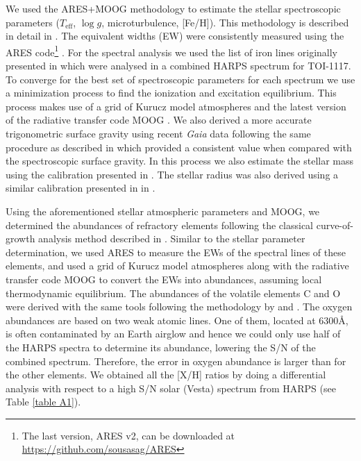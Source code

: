 \documentclass[fleqn,usenatbib,useAMS]{mnras}
\begin{document}
We used the ARES+MOOG methodology to estimate the stellar spectroscopic parameters ($T_{\mathrm{eff}}$, $\log g$, microturbulence, [Fe/H]). This methodology is described in detail in \citet[][]{Sousa-21, Sousa-14, Santos-13}. The equivalent widths (EW) were consistently measured using the ARES code\footnote{The last version, ARES v2, can be downloaded at \url{https://github.com/sousasag/ARES}} \citep{Sousa-07, Sousa-15}. For the spectral analysis we used the list of iron lines originally presented in \citet[][]{Sousa-08} which were analysed in a combined HARPS spectrum for TOI-1117. To converge for the best set of spectroscopic parameters for each spectrum we use a minimization process to find the ionization and excitation equilibrium. This process makes use of a grid of Kurucz model atmospheres \citep{Kurucz-93} and the latest version of the radiative transfer code MOOG \citep{Sneden-73}. We also derived a more accurate trigonometric surface gravity using recent \textit{Gaia} data following the same procedure as described in \citet[][]{Sousa-21} which provided a consistent value when compared with the spectroscopic surface gravity. In this process we also estimate the stellar mass using the calibration presented in \citet[][]{Torres-2010}. The stellar radius was also derived using a similar calibration presented in in \citet[][]{Torres-2010}.

Using the aforementioned stellar atmospheric parameters and MOOG, we determined the abundances of refractory elements following the classical curve-of-growth analysis method described in \citep[e.g.][]{Adibekyan-12, Adibekyan-15, DelgadoMena-17}. Similar to the stellar parameter determination, we used ARES to measure the EWs of the spectral lines of these elements, and used a grid of Kurucz model atmospheres \citep{Kurucz-93} along with the radiative transfer code MOOG \citep{Sneden-73} to convert the EWs into abundances, assuming local thermodynamic equilibrium. The abundances of the volatile elements C and O were derived with the same tools following the methodology by \citep{DelgadoMena-21} and \citep{Bertrandelis-15}. The oxygen abundances are based on two weak atomic lines. One of them, located at 6300\AA{}, is often contaminated by an Earth airglow and hence we could only use half of the HARPS spectra to determine its abundance, lowering the S/N of the combined spectrum. Therefore, the error in oxygen abundance is larger than for the other elements. We obtained all the [X/H] ratios by doing a differential analysis with respect to a high S/N solar (Vesta) spectrum from HARPS (see Table \ref{table A1}).
\end{document}
